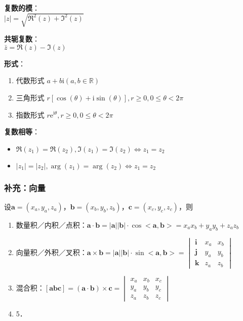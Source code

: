 \documentclass[
]{article}
\begin{document}
\textbf{复数的模}：\\
\(\left| z \right| = \sqrt{\Re^2(z) + \Im^2(z)}\)

\textbf{共轭复数}：\\
\(\bar z = \Re(z) - \Im(z)\)

\textbf{形式}：

\begin{enumerate}
\def\labelenumi{\arabic{enumi}.}
\item
  代数形式 \(a + b{\mathrm i}(a, b \in \mathbb R)\)
\item
  三角形式
  \(r[\cos(\theta) + {\mathrm i}\sin(\theta)], r \geqslant 0, 0 \leqslant \theta < 2\pi\)
\item
  指数形式
  \(r{\mathrm e}^{{\mathrm i}\theta}, r \geqslant 0, 0 \leqslant \theta < 2\pi\)
\end{enumerate}

\textbf{复数相等}：

\begin{itemize}
\item
  \(\Re(z_1) = \Re(z_2), \Im(z_1) = \Im(z_2) \Leftrightarrow z_1 = z_2\)
\item
  \(\left| z_1 \right| = \left| z_2 \right|, \arg(z_1) = \arg(z_2) \Leftrightarrow z_1 = z_2\)
\end{itemize}

\hypertarget{ux8865ux5145ux5411ux91cf}{%
\subsubsection{补充：向量}\label{ux8865ux5145ux5411ux91cf}}

设\(\boldsymbol{a}=(x_a, y_a, z_a)\)，\(\boldsymbol{b}=(x_b, y_b, z_b)\)，\(\boldsymbol{c}=(x_c, y_c, z_c)\)，则

\begin{enumerate}
\def\labelenumi{\arabic{enumi}.}
\item
  数量积／内积／点积：\(\boldsymbol{a} \cdot \boldsymbol{b} = \left | \boldsymbol{a}\right| \left | \boldsymbol{b}\right| \cdot \cos<\boldsymbol{a},\boldsymbol{b}>=x_ax_b+y_ay_b+z_az_b\)
\item
  向量积／外积／叉积：\(\boldsymbol{a} \times \boldsymbol{b} = \left | \boldsymbol{a}\right| \left | \boldsymbol{b}\right| \cdot \sin<\boldsymbol{a},\boldsymbol{b}>= \begin{vmatrix} \boldsymbol{i} & x_a & x_b \\ \boldsymbol{j} & y_a & y_b \\ \boldsymbol{k} & z_a & z_b\end{vmatrix}\)
\item
  混合积：\([\boldsymbol{a}\boldsymbol{b}\boldsymbol{c}] = (\boldsymbol{a}\cdot\boldsymbol{b})\times\boldsymbol{c} = \begin{vmatrix} x_a & x_b &x_c \\ y_a & y_b &y_c \\ z_a & z_b & z_c \end{vmatrix}\)
\item
  5．
\end{enumerate}
\end{document}
